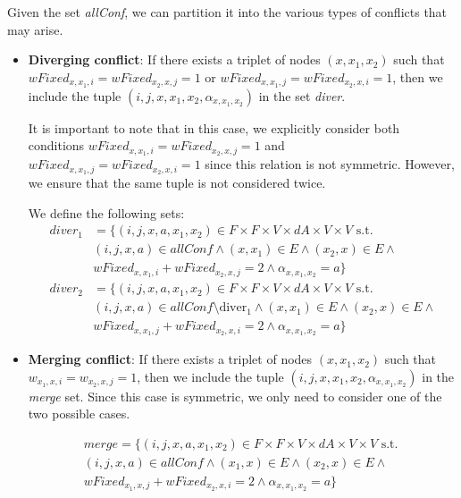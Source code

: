 \documentclass[../thesis.tex]{subfiles}
\begin{document}
Given the set \textit{allConf}, we can partition it into the various types of conflicts that may arise.

\begin{itemize}
    \item \textbf{Diverging conflict}: If there exists a triplet of nodes $(x, x_1, x_2)$ such that \newline $wFixed_{x,x_1,i} = wFixed_{x_2,x,j} = 1$ or $wFixed_{x,x_1,j} = wFixed_{x_2,x,i} = 1$, then we include the tuple $(i,j,x,x_1,x_2, \alpha_{x,x_1,x_2})$ in the set \textit{diver}.
    
    It is important to note that in this case, we explicitly consider both conditions $wFixed_{x,x_1,i} = wFixed_{x_2,x,j} = 1$ and $wFixed_{x,x_1,j} = wFixed_{x_2,x,i} = 1$ since this relation is not symmetric. However, we ensure that the same tuple is not considered twice.
    
    We define the following sets:
    \begin{align}
        diver_1 &= \{(i, j, x, a, x_1, x_2) \in F \times F \times V \times dA \times V \times V \text{ s.t. } \nonumber\\ 
        & (i,j,x,a)\in allConf \land (x,x_1) \in E \land (x_2,x) \in E \land \nonumber\\ 
        & wFixed_{x,x_1,i} + wFixed_{x_2,x,j} = 2 \land \alpha_{x,x_1,x_2} = a \}\\
        diver_2 &= \{(i, j, x, a, x_1, x_2) \in F \times F \times V \times dA \times V \times V \text{ s.t. } \nonumber\\ 
        & (i,j,x,a)\in allConf \setminus \text{diver}_1 \land (x,x_1) \in E \land (x_2,x) \in E \land \nonumber\\ 
        & wFixed_{x,x_1,j} + wFixed_{x_2,x,i} = 2 \land \alpha_{x,x_1,x_2} = a \}
    \end{align}
    
    \item \textbf{Merging conflict}: If there exists a triplet of nodes $(x, x_1, x_2)$ such that $w_{x_1,x,i} = w_{x_2,x,j} = 1$, then we include the tuple $(i,j,x,x_1,x_2, \alpha_{x,x_1,x_2})$ in the \textit{merge} set.
    Since this case is symmetric, we only need to consider one of the two possible cases.

    \begin{align}
    merge = \{(i, j, x, a, x_1, x_2) \in F \times F \times V \times dA \times V \times V \text{ s.t. } \nonumber\\
    (i,j,x,a)\in allConf \land (x_1,x) \in E \land (x_2,x) \in E \land \nonumber\\
    wFixed_{x_1,x,j} + wFixed_{x_2,x,i} = 2 \land \alpha_{x,x_1,x_2} = a \}
    \end{align}


\end{itemize}
\end{document}
